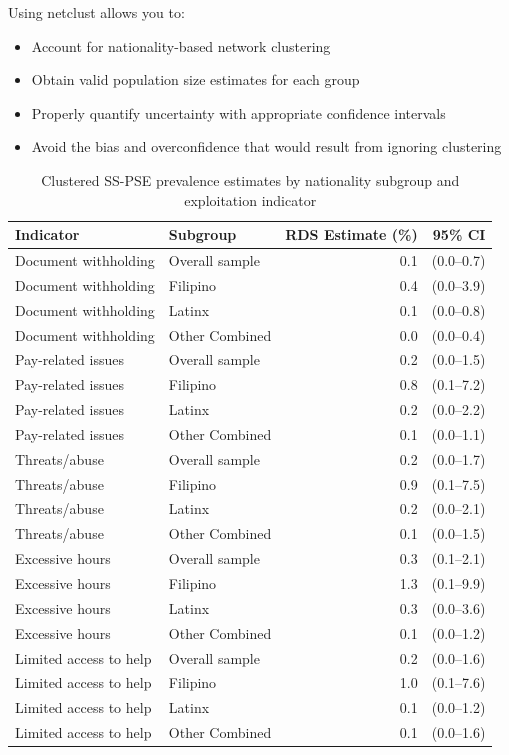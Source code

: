 \documentclass[
  12pt,
  letterpaper,
  DIV=11,
  numbers=noendperiod]{scrartcl}
\providecommand{\tightlist}{%
  \setlength{\itemsep}{0pt}\setlength{\parskip}{0pt}}
\theoremstyle{plain}
\theoremstyle{definition}
\begin{document}
Using netclust allows you to:

\begin{itemize}
\tightlist
\item
  Account for nationality-based network clustering
\item
  Obtain valid population size estimates for each group
\item
  Properly quantify uncertainty with appropriate confidence intervals
\item
  Avoid the bias and overconfidence that would result from ignoring
  clustering
\end{itemize}

\begin{longtable}[t]{llrr}
\caption{\label{tab:netclust-analysis}Clustered SS-PSE prevalence estimates by nationality subgroup and exploitation indicator}\\
\toprule
Indicator & Subgroup & RDS Estimate (\%) & 95\% CI\\
\midrule
Document
withholding & Overall sample & 0.1 & (0.0–0.7)\\
Document
withholding & Filipino & 0.4 & (0.0–3.9)\\
Document
withholding & Latinx & 0.1 & (0.0–0.8)\\
Document
withholding & Other
Combined & 0.0 & (0.0–0.4)\\
Pay-related issues & Overall sample & 0.2 & (0.0–1.5)\\
Pay-related issues & Filipino & 0.8 & (0.1–7.2)\\
Pay-related issues & Latinx & 0.2 & (0.0–2.2)\\
Pay-related issues & Other
Combined & 0.1 & (0.0–1.1)\\
Threats/abuse & Overall sample & 0.2 & (0.0–1.7)\\
Threats/abuse & Filipino & 0.9 & (0.1–7.5)\\
Threats/abuse & Latinx & 0.2 & (0.0–2.1)\\
Threats/abuse & Other
Combined & 0.1 & (0.0–1.5)\\
Excessive hours & Overall sample & 0.3 & (0.1–2.1)\\
Excessive hours & Filipino & 1.3 & (0.1–9.9)\\
Excessive hours & Latinx & 0.3 & (0.0–3.6)\\
Excessive hours & Other
Combined & 0.1 & (0.0–1.2)\\
Limited access to help & Overall sample & 0.2 & (0.0–1.6)\\
Limited access to help & Filipino & 1.0 & (0.1–7.6)\\
Limited access to help & Latinx & 0.1 & (0.0–1.2)\\
Limited access to help & Other
Combined & 0.1 & (0.0–1.6)\\
\bottomrule
\end{longtable}
\end{document}
